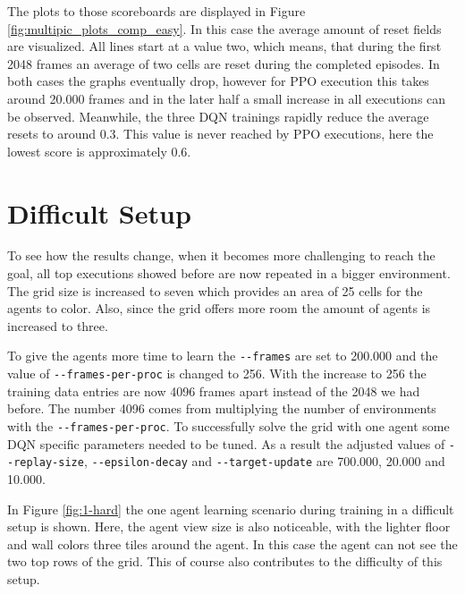 The plots to those scoreboards are displayed in Figure \ref{fig:multipic_plots_comp_easy}. In this case the average amount of reset fields are visualized. All lines start at a value two, which means, that during the first 2048 frames an average of two cells are reset during the completed episodes. In both cases the graphs eventually drop, however for PPO execution this takes around 20.000 frames and in the later half a small increase in all executions can be observed. Meanwhile, the three DQN trainings rapidly reduce the average resets to around 0.3. This value is never reached by PPO executions, here the lowest score is approximately 0.6.

\section{Difficult Setup} \label{difficult_env}
To see how the results change, when it becomes more challenging to reach the goal, all top executions showed before are now repeated in a bigger environment. The grid size is increased to seven which provides an area of 25 cells for the agents to color. Also, since the grid offers more room the amount of agents is increased to three.

To give the agents more time to learn the \verb|--frames| are set to 200.000 and the value of \verb|--frames-per-proc| is changed to 256. With the increase to 256 the training data entries are now 4096 frames apart instead of the 2048 we had before. The number 4096 comes from multiplying the number of environments with the \verb|--frames-per-proc|. To successfully solve the grid with one agent some DQN specific parameters needed to be tuned. As a result the adjusted values of \verb|--replay-size|, \verb|--epsilon-decay| and \verb|--target-update| are 700.000, 20.000 and 10.000. 

In Figure \ref{fig:1-hard} the one agent learning scenario during training in a difficult setup is shown. Here, the agent view size is also noticeable, with the lighter floor and wall colors three tiles around the agent. In this case the agent can not see the two top rows of the grid. This of course also contributes to the difficulty of this setup. \\

